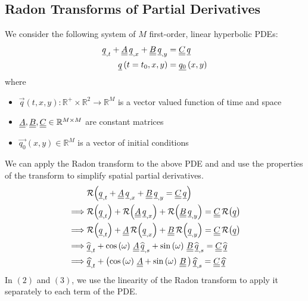 \subsection{Radon Transforms of Partial Derivatives}

We consider the following system of $M$ first-order, linear hyperbolic PDEs:
\begin{align*}
	{\underline{q}}_{,t} + {\underline{\underline{A}}}\,{\underline{q}}_{,x} + {\underline{\underline{B}}}\,{\underline{q}}_{,y} & = {\underline{\underline{C}}}\,{\underline{q}} \\
	{\underline{q}} \left( t = t_0, x, y \right) & = {\underline{q_0}} \left( x, y \right)
\end{align*}
where 
\begin{itemize}
    \item $\vec{q}(t, x, y): \mathbb{R}^{+} \times \mathbb{R}^{2} \rightarrow \mathbb{R}^{M}$ is a vector valued function of time and space
    \item ${\underline{\underline{A}}}, {\underline{\underline{B}}}, {\underline{\underline{C}}} \in \mathbb{R}^{M \times M}$ are constant matrices
    \item $\vec{q_{0}}(x, y) \in \mathbb{R}^{M}$ is a vector of initial conditions
\end{itemize}
We can apply the Radon transform to the above PDE and and use the properties of the transform to simplify spatial partial derivatives.
\begin{align}
	& \mathcal{R}{\left( {\underline{q}}_{,t} + {\underline{\underline{A}}}\, {\underline{q}}_{,x} + {\underline{\underline{B}}} \, {\underline{q}}_{,y} = {\underline{\underline{C}}} \, {\underline{q}} \right)} \\
	\implies & \mathcal{R}{\left( {\underline{q}}_{,t} \right)} + \mathcal{R}{\left( {\underline{\underline{A}}} \, {\underline{q}}_{, x} \right)} + \mathcal{R}{\left( {\underline{\underline{B}}} \, {\underline{q}}_{, y} \right)} = {\underline{\underline{C}}} \, \mathcal{R}{\left( {\underline{q}} \right)} \\
	\implies & \mathcal{R}{\left( {\underline{q}}_{,t} \right)} + {\underline{\underline{A}}} \,\mathcal{R}{\left(  {\underline{q}}_{, x} \right)} + {\underline{\underline{B}}} \,\mathcal{R}{\left(  {\underline{q}}_{, y} \right)} = {\underline{\underline{C}}} \, \mathcal{R}{\left( {\underline{q}} \right)} \\
	\implies & \widehat{{\underline{q}}}_{, t} + \cos \left( \omega \right) \, {\underline{\underline{A}}} \, \widehat{{\underline{q}}}_{, s} + \sin \left( \omega \right) \, {\underline{\underline{B}}} \, \widehat{{\underline{q}}}_{, s} = {\underline{\underline{C}}} \, \widehat{{\underline{q}}} \\
	\implies & {\underline{\widehat{q}}}_{,t} + \left( \cos \left( \omega \right) \, {\underline{\underline{A}}} + \sin \left( \omega \right) \, {\underline{\underline{B}}} \, \right) {\underline{\widehat{q}}}_{,s} = {\underline{\underline{C}}}\,{\underline{\widehat{q}}}
\end{align}
In $(2)$ and $(3)$, we use the linearity of the Radon transform to apply it separately to each term of the PDE.
